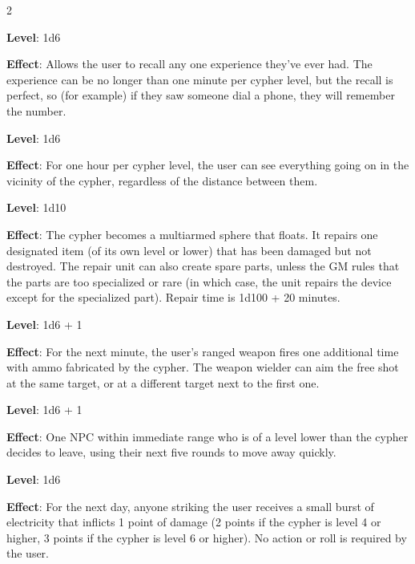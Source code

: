 \begin{multicols}{2}


\textbf{Level}: 1d6

\textbf{Effect}: Allows the user to recall any one experience they’ve ever had. The experience can be no longer than one minute per cypher level, but the recall is perfect, so (for example) if they saw someone dial a phone, they will remember the number.


\textbf{Level}: 1d6

\textbf{Effect}: For one hour per cypher level, the user can see everything going on in the vicinity of the cypher, regardless of the distance between them.


\textbf{Level}: 1d10

\textbf{Effect}: The cypher becomes a multiarmed sphere that floats. It repairs one designated item (of its own level or lower) that has been damaged but not destroyed. The repair unit can also create spare parts, unless the GM rules that the parts are too specialized or rare (in which case, the unit repairs the device except for the specialized part). Repair time is 1d100 + 20 minutes.


\textbf{Level}: 1d6 + 1

\textbf{Effect}: For the next minute, the user’s ranged weapon fires one additional time with ammo fabricated by the cypher. The weapon wielder can aim the free shot at the same target, or at a different target next to the first one.


\textbf{Level}: 1d6 + 1

\textbf{Effect}: One NPC within immediate range who is of a level lower than the cypher decides to leave, using their next five rounds to move away quickly.


\textbf{Level}: 1d6

\textbf{Effect}: For the next day, anyone striking the user receives a small burst of electricity that inflicts 1 point of damage (2 points if the cypher is level 4 or higher, 3 points if the cypher is level 6 or higher). No action or roll is required by the user.



\end{multicols}
